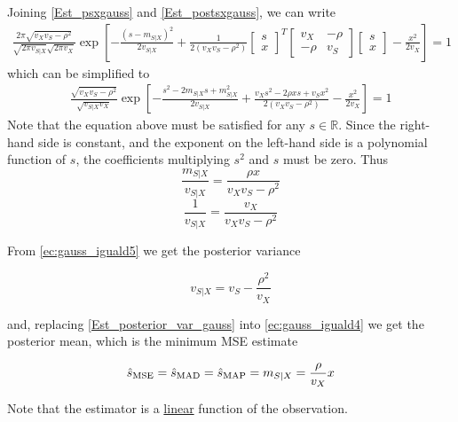 Joining \eqref{Est_psxgauss} and \eqref{Est_postsxgauss}, we can write
\begin{align}
\frac{2\pi \sqrt{v_X v_S - \rho^2}}{\sqrt{2\pi v_{S|X}}\sqrt{2\pi v_X}} 
\exp\left[- \frac{(s - m_{S|X})^2}{2 v_{S|X}}
          + \frac{1}{2(v_X v_S - \rho^2)} \begin{bmatrix} s \\ x \end{bmatrix}^T
	                                      \begin{bmatrix} v_X & -\rho \\ -\rho & v_S \end{bmatrix} 
	                                      \begin{bmatrix} s \\ x \end{bmatrix}    
	      - \frac{x^2}{2 v_X}
	\right] = 1
\end{align}
{which can be simplified to
\begin{align}
\frac{\sqrt{v_X v_S - \rho^2}}{\sqrt{v_{S|X} v_X}} 
\exp\left[- \frac{s^2 - 2m_{S|X} s + m_{S|X}^2}{2 v_{S|X}}
          + \frac{v_X s^2 - 2 \rho x s + v_S x^2}{2(v_X v_S - \rho^2)}     
	      - \frac{x^2}{2 v_X}
	\right] = 1
\end{align}
Note that the equation above must be satisfied for any $s\in\mathbb{R}$. Since the right-hand side is constant, and the exponent on the left-hand side is a polynomial function of $s$, the coefficients multiplying $s^2$  and $s$ must be zero. Thus}
\begin{equation}
\label{ec:gauss_iguald4}
\frac{m_{S|X}}{v_{S|X}} = \frac{\rho x}{v_X v_S - \rho^2}
\end{equation}
\begin{equation}
\label{ec:gauss_iguald5}
\frac{1}{v_{S|X}} = \frac{v_X}{v_X v_S - \rho^2}
\end{equation}
{From \eqref{ec:gauss_iguald5} we get the posterior variance
\begin{framed}
\begin{equation}
\label{Est_posterior_var_gauss}
v_{S|X} = v_S - \frac{\rho^2}{v_X}
\end{equation}
\end{framed}
\noindent and, replacing \eqref{Est_posterior_var_gauss} into \eqref{ec:gauss_iguald4} we get the posterior mean, which is the minimum MSE estimate}
\begin{framed}
\begin{equation}
\label{ec_estimador_caso_gaussiano_final}
\hat{s}_\text{MSE} = \hat{s}_\text{MAD} = \hat{s}_\text{MAP} = m_{S|X} = \frac{\rho}{v_X} x
\end{equation}
\end{framed}
Note that the estimator is a \underline{linear} function of the observation.

